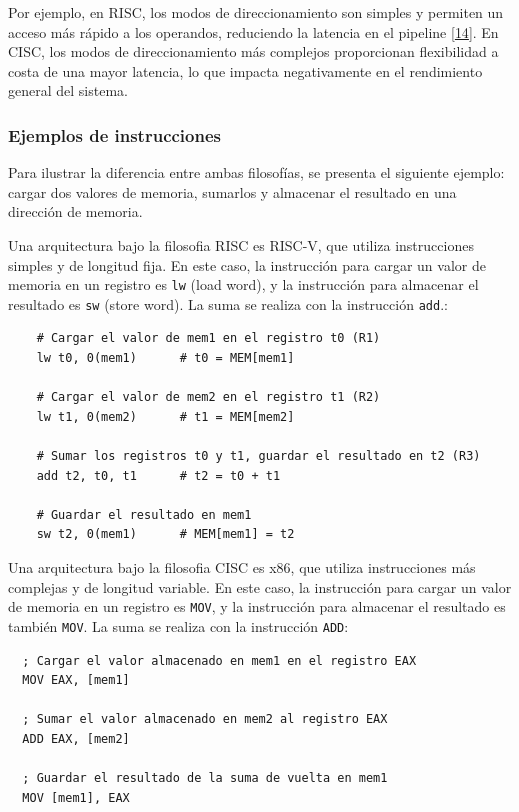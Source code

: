 \documentclass[12pt,oneside]{templates/unerthesis}
\begin{document}
Por ejemplo, en RISC, los modos de direccionamiento son simples y permiten un acceso más rápido a los operandos, reduciendo la latencia en el pipeline \protect\hyperlink{ref-stallings_computer_2021}{{[}14{]}}. En CISC, los modos de direccionamiento más complejos proporcionan flexibilidad a costa de una mayor latencia, lo que impacta negativamente en el rendimiento general del sistema.

\hypertarget{ejemplos-de-instrucciones}{%
\subsubsection{Ejemplos de instrucciones}\label{ejemplos-de-instrucciones}}

Para ilustrar la diferencia entre ambas filosofías, se presenta el siguiente ejemplo: cargar dos valores de memoria, sumarlos y almacenar el resultado en una dirección de memoria.

Una arquitectura bajo la filosofia RISC es RISC-V, que utiliza instrucciones simples y de longitud fija. En este caso, la instrucción para cargar un valor de memoria en un registro es \texttt{lw} (load word), y la instrucción para almacenar el resultado es \texttt{sw} (store word). La suma se realiza con la instrucción \texttt{add}.:

\begin{lstlisting}
    # Cargar el valor de mem1 en el registro t0 (R1)
    lw t0, 0(mem1)      # t0 = MEM[mem1]

    # Cargar el valor de mem2 en el registro t1 (R2)
    lw t1, 0(mem2)      # t1 = MEM[mem2]

    # Sumar los registros t0 y t1, guardar el resultado en t2 (R3)
    add t2, t0, t1      # t2 = t0 + t1

    # Guardar el resultado en mem1
    sw t2, 0(mem1)      # MEM[mem1] = t2
  \end{lstlisting}

Una arquitectura bajo la filosofia CISC es x86, que utiliza instrucciones más complejas y de longitud variable. En este caso, la instrucción para cargar un valor de memoria en un registro es \texttt{MOV}, y la instrucción para almacenar el resultado es también \texttt{MOV}. La suma se realiza con la instrucción \texttt{ADD}:

\begin{lstlisting}
  ; Cargar el valor almacenado en mem1 en el registro EAX
  MOV EAX, [mem1]

  ; Sumar el valor almacenado en mem2 al registro EAX
  ADD EAX, [mem2]

  ; Guardar el resultado de la suma de vuelta en mem1
  MOV [mem1], EAX
  \end{lstlisting}
\end{document}
